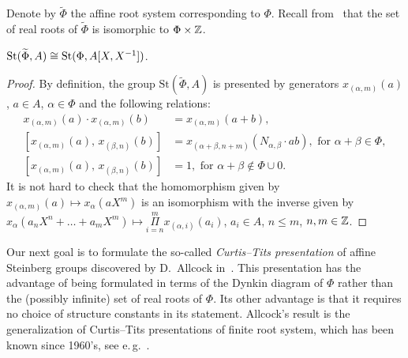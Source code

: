 Denote by $\widetilde{\Phi}$ the affine root system corresponding to $\Phi$.
Recall from~\cite[\S~4]{A16} that the set of real roots of $\widetilde{\Phi}$ is isomorphic to $\Phi \times \mathbb{Z}$.
\begin{lemma} \label{lem:affine-vs-loop} $\operatorname{St}(\widetilde{\Phi}, A) \cong \operatorname{St}(\Phi, A[X, X^{-1}])$.
\end{lemma}
\begin{proof}
    By definition, the group $\mathrm{St}(\widetilde{\Phi}, A)$ is presented by generators $x_{(\alpha, m)}(a)$, $a \in A$, $\alpha \in \Phi$ and
    the following relations:
    \begin{align}
        x_{(\alpha, m)}(a)\cdot x_{(\alpha, m)}(b)&=x_{(\alpha, m)}(a+b),  \label{AR1}\\
        [x_{(\alpha, m)}(a),\,x_{(\beta, n)}(b)]  &=x_{(\alpha+\beta, n+m)}(N_{\alpha,\beta} \cdot ab),\text{ for }\alpha+\beta\in\Phi, \label{AR2} \\
        [x_{(\alpha, m)}(a),\,x_{(\beta, n)}(b)]  &=1,\text{ for }\alpha+\beta\not\in\Phi\cup0. \label{AR3}
    \end{align}
    It is not hard to check that the homomorphism given by $x_{(\alpha, m)}(a) \mapsto x_\alpha(aX^m)$ is an isomorphism with the inverse given by
    $x_\alpha(a_{n}X^n + \ldots + a_m X^m) \mapsto \Pi\limits_{i=n}^m x_{(\alpha, i)}(a_i)$, $a_i \in A$, $n \leq m$, $n, m\in \mathbb{Z}$.
\end{proof}

Our next goal is to formulate the so-called \textit{Curtis--Tits presentation} of affine Steinberg groups discovered by D.~Allcock in~\cite{A16, A13}.
This presentation has the advantage of being formulated in terms of the Dynkin diagram of $\Phi$ rather than the (possibly infinite) set of real roots of $\Phi$.
Its other advantage is that it requires no choice of structure constants in its statement.
Allcock's result is the generalization of Curtis--Tits presentations of finite root system, which has been known since 1960's, see e.\,g.~\cite[Theorem~B]{DS74}.

